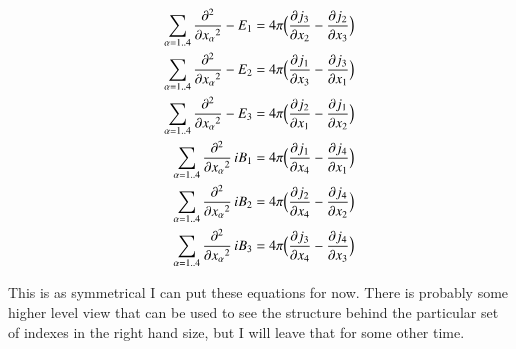\documentclass{article}      %
\newcommand{\delambert}[1]{\sum_{\alpha = 1 .. 4}{\Dsq{x_\alpha}{#1}}}
\newcommand{\D}[2] {\frac {\partial #2} {\partial #1}}
\newcommand{\Dsq}[2] {\frac {\partial^2 #2} {\partial {#1}^2}}
\begin{document}
\begin{align*}
\delambert{} -E_1 &= 4\pi \Bigl(\D{x_2}{j_3} - \D{x_3}{j_2} \Bigr) \\
\delambert{} -E_2 &= 4\pi \Bigl(\D{x_3}{j_1} - \D{x_1}{j_3} \Bigr) \\
\delambert{} -E_3 &= 4\pi \Bigl(\D{x_1}{j_2} - \D{x_2}{j_1} \Bigr) \\
\delambert{} \,i B_1 &= 4\pi \Bigl(\D{x_4}{j_1} - \D{x_1}{j_4} \Bigr)\\
\delambert{} \,i B_2 &= 4\pi \Bigl(\D{x_4}{j_2} - \D{x_2}{j_4} \Bigr)\\
\delambert{} \,i B_3 &= 4\pi \Bigl(\D{x_4}{j_3} - \D{x_3}{j_4} \Bigr)
\end{align*}

This is as symmetrical I can put these equations for now.  There is probably some higher level 
view that can be used to see the structure behind the particular set of indexes in the right 
hand size, but I will leave that for some other time.
\end{document}
